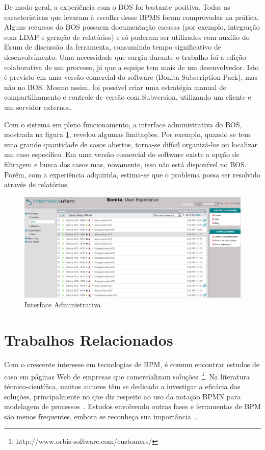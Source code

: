 \documentclass[12pt]{article}
\begin{document}
De modo geral, a experiência com o BOS foi bastante positiva. Todas as características que levaram à escolha desse BPMS foram comprovadas na prática. Alguns recursos do BOS possuem documentação escassa (por exemplo, integração com LDAP e geração de relatórios) e só puderam ser utilizados com auxílio do fórum de discussão da ferramenta, consumindo tempo significativo de desenvolvimento. Uma necessidade que surgiu durante o trabalho foi a edição colaborativa de um processo, já que a equipe tem mais de um desenvolvedor. Isto é previsto em uma versão comercial do software (Bonita Subscription Pack), mas não no BOS. Mesmo assim, foi possível criar uma estratégia manual de compartilhamento e controle de versão com Subversion, utilizando um cliente e um servidor externos.

Com o sistema em pleno funcionamento, a interface administrativa do BOS, mostrada na figura \ref{fig:interfaceadm}, revelou algumas limitações. Por exemplo, quando se tem uma grande quantidade de casos abertos, torna-se difícil organizá-los ou localizar um caso específico. Em uma versão comercial do software existe a opção de filtragem e busca dos casos mas, novamente, isso não está disponível no BOS. Porém, com a experiência adquirida, estima-se que o problema possa ser resolvido através de relatórios.

\begin{figure}[ht]
\centering
\includegraphics[width=.99\textwidth]{images/interfaceAdministrativa.png}
\caption{Interface Administrativa}
\label{fig:interfaceadm}
\end{figure}

\section{Trabalhos Relacionados}

Com o crescente interesse em tecnologias de BPM, é comum encontrar estudos de caso em páginas Web de empresas que comercializam soluções~\footnote{http://www.orbis-software.com/customers/}. Na literatura técnico-científica, muitos autores têm se dedicado a investigar a eficácia das soluções, principalmente no que diz respeito ao uso da notação BPMN para modelagem de processos~\cite{recker2006, muehlen2008, ostroski-sbsi2012}. Estudos envolvendo outras fases e ferramentas de BPM são menos frequentes, embora se reconheça sua importância~\cite{SORDI2007, wohed2009patterns}.
\end{document}
